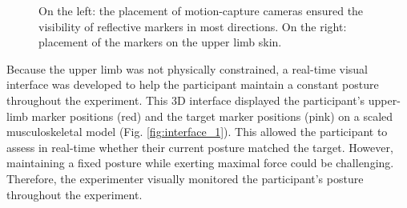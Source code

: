 \begin{figure}[!htb]
\begin{minipage}{0.4\linewidth}
    \end{minipage}
    \caption{On the left: the placement of motion-capture cameras ensured the visibility of reflective markers in most directions. On the right: placement of the markers on the upper limb skin.}
    \label{fig:motion_capture}
\end{figure}

Because the upper limb was not physically constrained, a real-time visual interface was developed to help the participant maintain a constant posture throughout the experiment. This 3D interface displayed the participant's upper-limb marker positions (red) and the target marker positions (pink) on a scaled musculoskeletal model (Fig. \ref{fig:interface_1}). This allowed the participant to assess in real-time whether their current posture matched the target. However, maintaining a fixed posture while exerting maximal force could be challenging. Therefore, the experimenter visually monitored the participant's posture throughout the experiment.

